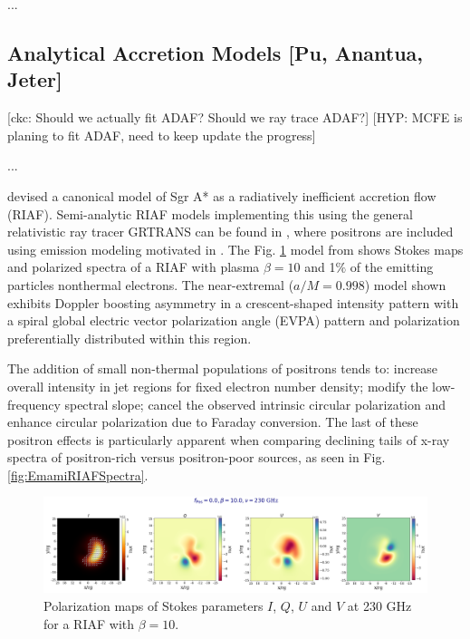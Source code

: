 \documentclass[twocolumn,tighten,dvipsnames,linenumbers]{aastex63}
\newcommand\ckc[1]{{\color{MidnightBlue}[ckc: #1]}}
\newcommand\hyp[1]{{\color{Salmon}[HYP: #1]}}
\begin{document}
...

\subsection{Analytical Accretion Models
  [Pu, Anantua, Jeter]}
\label{sec:anamodels}

\ckc{Should we actually fit ADAF?
  Should we ray trace ADAF?}
\hyp{MCFE is planing to fit ADAF, need to keep update the progress}

...

\cite{Broderick2005} devised a canonical model of Sgr A* as a  radiatively inefficient accretion flow (RIAF). Semi-analytic RIAF models implementing  this using the general relativistic ray tracer GRTRANS \citep{2016MNRAS.462..115D} can be found in  \cite{Emami2021}, where  positrons are included using emission modeling motivated in  \cite{Anantua:2019bna}. The Fig. \ref{fig:EmamiRIAF} model from \cite{Emami2021}  shows Stokes maps and polarized spectra of a \cite{Broderick2005} RIAF with plasma $\beta=10$ and 1$\%$ of the emitting particles nonthermal electrons. The near-extremal ($a/M=0.998$) model shown exhibits Doppler boosting asymmetry in a crescent-shaped intensity pattern with a spiral global electric vector polarization angle (EVPA) pattern and polarization preferentially distributed within this region.


The addition of small non-thermal populations of positrons \citep{Anantua:2019bna,Emami2021} tends to: increase overall intensity in jet regions for fixed electron number density; modify the low-frequency spectral slope; cancel the observed intrinsic circular polarization and enhance circular polarization due to Faraday conversion. The last of these positron effects is particularly apparent when comparing declining tails of x-ray spectra of positron-rich versus positron-poor sources, as seen in Fig. \ref{fig:EmamiRIAFSpectra}.

\begin{figure}%
\includegraphics[width=.5\textwidth,height=27mm%
]{RIAFSgrAPlaneTscl1Pt5e11beta1Pt0e01fpos0Pt0fNTH1Pt0e-02copy}
  \caption{Polarization maps of Stokes parameters $I$, $Q$, $U$ and $V$ at 230 GHz for a \cite{Broderick2005} RIAF with $\beta=10$.}
  \label{fig:EmamiRIAF}
\end{figure}
\end{document}

